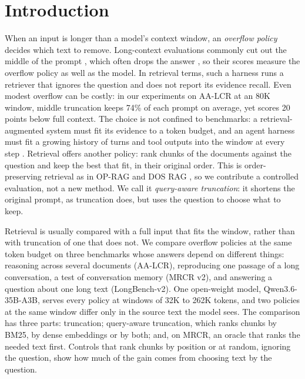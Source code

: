 \documentclass[letterpaper]{article} %
\begin{document}
\section{Introduction}
When an input is longer than a model's context window, an \emph{overflow policy} decides which text to remove. Long-context evaluations commonly cut out the middle of the prompt \cite{bai2024longbench,bai2025longbenchv2,zhang2024infinitebench,huang2026atlas}, which often drops the answer \cite{arjmandi2026distractor}, so their scores measure the overflow policy as well as the model. In retrieval terms, such a harness runs a retriever that ignores the question and does not report its evidence recall. Even modest overflow can be costly: in our experiments on AA-LCR at an 80K window, middle truncation keeps 74\% of each prompt on average, yet scores 20 points below full context. The choice is not confined to benchmarks: a retrieval-augmented system must fit its evidence to a token budget, and an agent harness must fit a growing history of turns and tool outputs into the window at every step \cite{packer2023memgpt}. Retrieval offers another policy: rank chunks of the documents against the question and keep the best that fit, in their original order. This is order-preserving retrieval as in OP-RAG and DOS RAG \cite{yu2024oprag,laitenberger2025dosrag}, so we contribute a controlled evaluation, not a new method. We call it \emph{query-aware truncation}: it shortens the original prompt, as truncation does, but uses the question to choose what to keep.

Retrieval is usually compared with a full input that fits the window, rather than with truncation of one that does not. We compare overflow policies at the same token budget on three benchmarks whose answers depend on different things: reasoning across several documents (AA-LCR), reproducing one passage of a long conversation, a test of conversation memory (MRCR v2), and answering a question about one long text (LongBench-v2). One open-weight model, Qwen3.6-35B-A3B, serves every policy at windows of 32K to 262K tokens, and two policies at the same window differ only in the source text the model sees. The comparison has three parts: truncation; query-aware truncation, which ranks chunks by BM25, by dense embeddings or by both; and, on MRCR, an oracle that ranks the needed text first. Controls that rank chunks by position or at random, ignoring the question, show how much of the gain comes from choosing text by the question.
\end{document}
